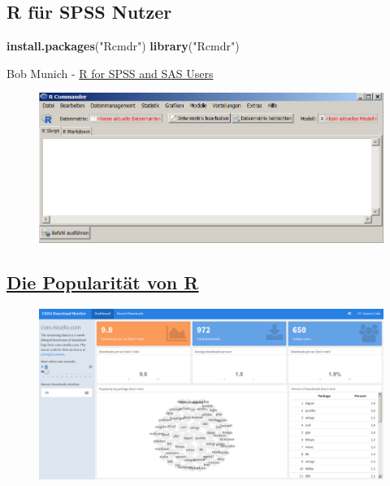 \documentclass[]{article}
\newenvironment{Shaded}{\begin{snugshade}}{\end{snugshade}}
\newcommand{\KeywordTok}[1]{\textcolor[rgb]{0.13,0.29,0.53}{\textbf{{#1}}}}
\newcommand{\StringTok}[1]{\textcolor[rgb]{0.31,0.60,0.02}{{#1}}}
\newcommand{\NormalTok}[1]{{#1}}
\begin{document}
\subsection{R für SPSS Nutzer}\label{r-fur-spss-nutzer}

\begin{Shaded}
\begin{Highlighting}[]
\KeywordTok{install.packages}\NormalTok{(}\StringTok{"Rcmdr"}\NormalTok{)}
\KeywordTok{library}\NormalTok{(}\StringTok{"Rcmdr"}\NormalTok{)}
\end{Highlighting}
\end{Shaded}

Bob Munich -
\href{https://science.nature.nps.gov/im/datamgmt/statistics/r/documents/r_for_sas_spss_users.pdf}{R
for SPSS and SAS Users}

\begin{figure}[htbp]
\centering
\includegraphics{figure/Rcommanderex.PNG}
\caption{}
\end{figure}

\subsection{\texorpdfstring{\href{https://gallery.shinyapps.io/cran-gauge/}{Die
Popularität von R}}{Die Popularität von R}}\label{die-popularitat-von-r}

\begin{figure}[htbp]
\centering
\includegraphics{figure/CRANdownloads.PNG}
\caption{}
\end{figure}
\end{document}
